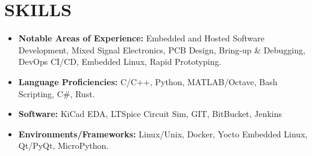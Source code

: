 
\section{SKILLS}
\begin{minipage}{\maincolumnwidth}%
	\small{
    	\begin{itemize}
        \item \textbf{Notable Areas of Experience:} Embedded and Hosted Software Development, Mixed Signal Electronics, PCB Design, Bring-up \& Debugging, DevOps CI/CD, Embedded Linux, Rapid Prototyping.
        \item \textbf{Language Proficiencies:} C/C++, Python, MATLAB/Octave, Bash Scripting, C\#, Rust.
        \item \textbf{Software:} KiCad EDA, LTSpice Circuit Sim, GIT, BitBucket, Jenkins
        \item \textbf{Environments/Frameworks:} Linux/Unix, Docker, Yocto Embedded Linux, Qt/PyQt, MicroPython.
		\end{itemize}}%
\end{minipage}
      



